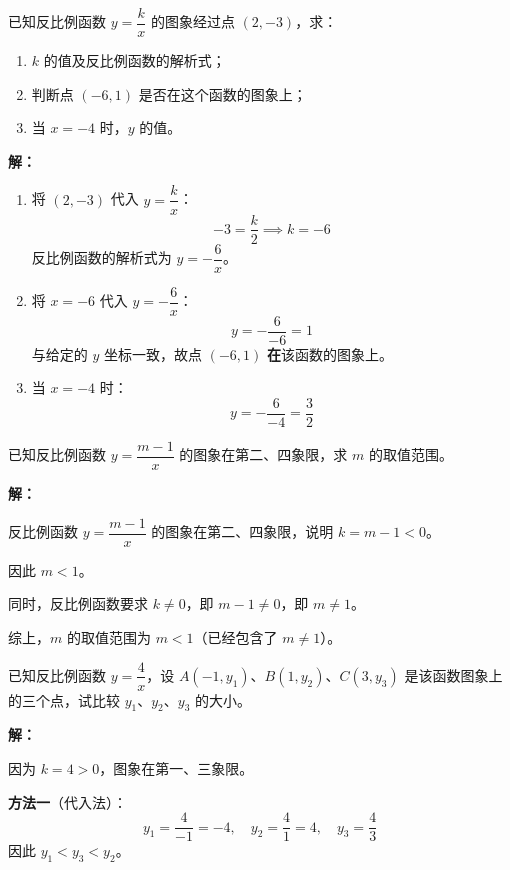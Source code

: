\documentclass[12pt, a4paper]{ctexart}
\begin{document}
\begin{examplebox}[【例2】待定系数法求解析式]
已知反比例函数 $y = \dfrac{k}{x}$ 的图象经过点 $(2, -3)$，求：
\begin{enumerate}[label=(\arabic*)]
  \item $k$ 的值及反比例函数的解析式；
  \item 判断点 $(-6, 1)$ 是否在这个函数的图象上；
  \item 当 $x = -4$ 时，$y$ 的值。
\end{enumerate}
\end{examplebox}

\textbf{解：}
\begin{enumerate}[label=(\arabic*)]
  \item 将 $(2, -3)$ 代入 $y = \dfrac{k}{x}$：
  \[
    -3 = \frac{k}{2} \implies k = -6
  \]
  反比例函数的解析式为 $y = -\dfrac{6}{x}$。

  \item 将 $x = -6$ 代入 $y = -\dfrac{6}{x}$：
  \[
    y = -\frac{6}{-6} = 1
  \]
  与给定的 $y$ 坐标一致，故点 $(-6, 1)$ \textbf{在}该函数的图象上。

  \item 当 $x = -4$ 时：
  \[
    y = -\frac{6}{-4} = \frac{3}{2}
  \]
\end{enumerate}

\begin{examplebox}[【例3】反比例函数的图象与性质]
已知反比例函数 $y = \dfrac{m - 1}{x}$ 的图象在第二、四象限，求 $m$ 的取值范围。
\end{examplebox}

\textbf{解：}

反比例函数 $y = \dfrac{m-1}{x}$ 的图象在第二、四象限，说明 $k = m - 1 < 0$。

因此 $m < 1$。

同时，反比例函数要求 $k \neq 0$，即 $m - 1 \neq 0$，即 $m \neq 1$。

综上，$m$ 的取值范围为 $m < 1$（已经包含了 $m \neq 1$）。

\begin{examplebox}[【例4】比较函数值大小]
已知反比例函数 $y = \dfrac{4}{x}$，设 $A(-1, y_1)$、$B(1, y_2)$、$C(3, y_3)$ 是该函数图象上的三个点，试比较 $y_1$、$y_2$、$y_3$ 的大小。
\end{examplebox}

\textbf{解：}

因为 $k = 4 > 0$，图象在第一、三象限。

\textbf{方法一}（代入法）：
\[
  y_1 = \frac{4}{-1} = -4, \quad y_2 = \frac{4}{1} = 4, \quad y_3 = \frac{4}{3}
\]
因此 $y_1 < y_3 < y_2$。
\end{document}
